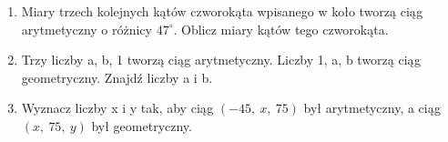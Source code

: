 \documentclass[12pt,a4paper]{article}
\begin{document}
\begin{enumerate}[1.]
		\item Miary trzech kolejnych kątów czworokąta wpisanego w koło tworzą ciąg arytmetyczny
		o różnicy $47^\circ$. Oblicz miary kątów tego czworokąta.
		
		\item Trzy liczby a, b, 1 tworzą ciąg arytmetyczny. Liczby 1, a, b tworzą ciąg geometryczny. Znajdź liczby a i b.
		
		\item Wyznacz liczby x i y tak, aby ciąg $(-45,\: x,\: 75)$ był arytmetyczny, a ciąg $(x,\: 75,\: y)$ był geometryczny.
		
	\end{enumerate}
	
\end{document}
